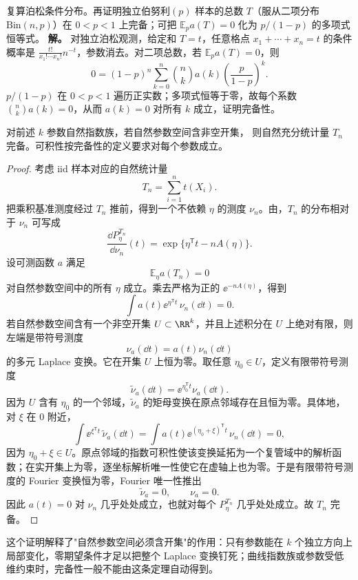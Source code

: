 \begin{workedexample}
复算泊松条件分布。再证明独立伯努利\((p)\) 样本的总数 \(T\)（服从二项分布 \(\mathrm{Bin}(n,p)\)）在 \(0<p<1\) 上完备；可把 \(\mathbb E_p a(T)=0\) 化为 \(p/(1-p)\) 的多项式恒等式。
\textbf{解。} 对独立泊松观测，给定和 \(T=t\)，任意格点 \(x_1+\cdots+x_n=t\) 的条件概率是 \(\frac{t!}{x_1!\cdots x_n!}n^{-t}\)，参数消去。对二项总数，若 \(\mathbb E_pa(T)=0\)，则
\[
0=(1-p)^n\sum_{k=0}^n {n\choose k}a(k)\left(\frac p{1-p}\right)^k.
\]
\(p/(1-p)\) 在 \(0<p<1\) 遍历正实数；多项式恒等于零，故每个系数 \({n\choose k}a(k)=0\)，从而 \(a(k)=0\) 对所有 \(k\) 成立，证明完备性。
\end{workedexample}

\begin{theorem}[开自然参数域上的完备性]
对前述 $k$ 参数自然指数族，若自然参数空间含非空开集，
则自然充分统计量 $T_n$ 完备。可积性按完备性的定义要求对每个参数成立。
\end{theorem}
\begin{proof}
考虑 iid 样本对应的自然统计量
\[
 T_n=\sum_{i=1}^nt(X_i).
\]
把乘积基准测度经过 $T_n$ 推前，得到一个不依赖 $\eta$ 的测度 $\nu_n$。由，$T_n$ 的分布相对于 $\nu_n$ 可写成
\[
 \frac{\dd P_\eta^{T_n}}{\dd\nu_n}(t)
 =\exp\{\eta^{\mathsf T}t-nA(\eta)\}.
\]
设可测函数 $a$ 满足
\[
 \mathbb E_\eta a(T_n)=0
\]
对自然参数空间中的所有 $\eta$ 成立。乘去严格为正的 $\ee^{-nA(\eta)}$，得到
\[
 \int a(t)\ee^{\eta^{\mathsf T}t}\,\nu_n(\dd t)=0.
\]
若自然参数空间含有一个非空开集 $U\subset\RR^k$，并且上述积分在 $U$ 上绝对有限，则左端是带符号测度
\[
 \nu_a(\dd t)=a(t)\nu_n(\dd t)
\]
的多元 Laplace 变换。它在开集 $U$ 上恒为零。取任意 $\eta_0\in U$，定义有限带符号测度
\[
 \widetilde\nu_a(\dd t)
 =\ee^{\eta_0^{\mathsf T}t}\nu_a(\dd t).
\]
因为 $U$ 含有 $\eta_0$ 的一个邻域，$\widetilde\nu_a$ 的矩母变换在原点邻域存在且恒为零。具体地，对 $\xi$ 在 $0$ 附近，
\[
\int\ee^{\xi^{\mathsf T}t}\,\widetilde\nu_a(\dd t)
=\int a(t)\ee^{(\eta_0+\xi)^{\mathsf T}t}\,\nu_n(\dd t)=0,
\]
因为 $\eta_0+\xi\in U$。原点邻域的指数可积性使该变换延拓为一个复管域中的解析函数；在实开集上为零，逐坐标解析唯一性使它在虚轴上也为零。于是有限带符号测度的 Fourier 变换恒为零，Fourier 唯一性推出
\[
 \widetilde\nu_a=0,
 \qquad
 \nu_a=0.
\]
因此 $a(t)=0$ 对 $\nu_n$ 几乎处处成立，也就对每个 $P_\eta^{T_n}$ 几乎处处成立。故 $T_n$ 完备。
\end{proof}

这个证明解释了"自然参数空间必须含开集"的作用：只有参数能在 $k$ 个独立方向上局部变化，零期望条件才足以把整个 Laplace 变换钉死；曲线指数族或参数受低维约束时，完备性一般不能由这条定理自动得到。

